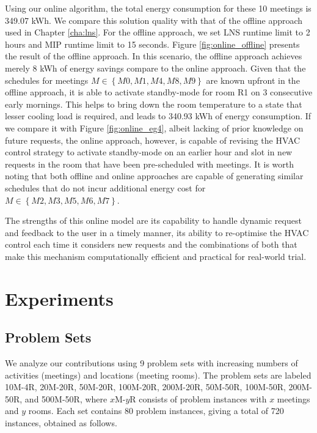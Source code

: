 Using our online algorithm, the total energy consumption for these 10 meetings is 349.07 kWh. We compare this solution quality with that of the offline approach used in Chapter \ref{cha:lns}. For the offline approach, we set LNS runtime limit to 2 hours and MIP runtime limit to 15 seconds. Figure \ref{fig:online_offline} presents the result of the offline approach. In this scenario, the offline approach achieves merely 8 kWh of energy savings compare to the online approach. 
Given that the schedules for meetings $M \in \left\{M0, M1, M4, M8, M9\right\}$ are known upfront in the offline approach, it is able to activate standby-mode for room R1 on 3 consecutive early mornings. This helps to bring down the room temperature to a state that lesser cooling load is required, and leads to 340.93 kWh of energy consumption. 
If we compare it with Figure \ref{fig:online_eg4}, albeit lacking of prior knowledge on future requests, the online approach, however, is capable of revising the HVAC control strategy to activate standby-mode on an earlier hour and slot in new requests in the room that have been pre-scheduled with meetings. 
It is worth noting that both offline and online approaches are capable of generating similar schedules that do not incur additional energy cost for $M \in \left\{M2, M3, M5, M6, M7\right\}$. 

The strengths of this online model are its capability to handle dynamic request and feedback to the user in a timely manner, its ability to re-optimise the HVAC control each time it considers new requests and the combinations of both that make this mechanism computationally efficient and practical for real-world trial.


\section{Experiments} \label{sec:online:experiments}
\subsection{Problem Sets}

We analyze our contributions using 9 problem sets with increasing numbers of activities (meetings) and locations (meeting rooms). The problem sets are labeled 10M-4R, 20M-20R, 50M-20R, 100M-20R, 200M-20R, 50M-50R, 100M-50R, 200M-50R, and 500M-50R, where $x$M-$y$R consists of problem instances with $x$ meetings and $y$ rooms. Each set contains 80 problem instances, giving a total of 720 instances, obtained as follows. 

